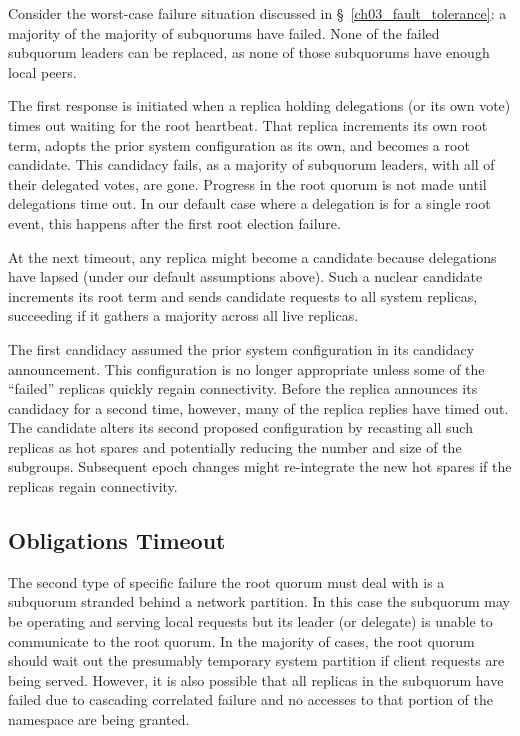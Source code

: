 Consider the worst-case failure situation discussed in \S~\ref{ch03_fault_tolerance}: a majority of the majority of subquorums have failed.
None of the failed subquorum leaders can be replaced, as none of those subquorums have enough local peers.

The first response is initiated when a replica holding delegations (or its own vote) times out waiting for the root heartbeat.
That replica increments its own root term, adopts the prior system configuration as its own, and becomes a root candidate.
This candidacy fails, as a majority of subquorum leaders, with all of their delegated votes, are gone.
Progress in the root quorum is not made until delegations time out.
In our default case where a delegation is for a single root event, this happens after the first root election failure.

At the next timeout, any replica might become a candidate because delegations have lapsed (under our default assumptions above).
Such a nuclear candidate increments its root term and sends candidate requests to all system replicas, succeeding if it gathers a majority across all live replicas.

The first candidacy assumed the prior system configuration in its candidacy announcement.
This configuration is no longer appropriate unless some of the ``failed'' replicas quickly regain connectivity.
Before the replica announces its candidacy for a second time, however, many of the replica replies have timed out.
The candidate alters its second proposed configuration by recasting all such replicas as hot spares and potentially reducing the number and size of the subgroups.
Subsequent epoch changes might re-integrate the new hot spares if the replicas regain connectivity.

\subsection{Obligations Timeout}
\label{ch03_obligations_timeout}

The second type of specific failure the root quorum must deal with is a subquorum stranded behind a network partition.
In this case the subquorum may be operating and serving local requests but its leader (or delegate) is unable to communicate to the root quorum.
In the majority of cases, the root quorum should wait out the presumably temporary system partition if client requests are being served.
However, it is also possible that all replicas in the subquorum have failed due to cascading correlated failure and no accesses to that portion of the namespace are being granted.

